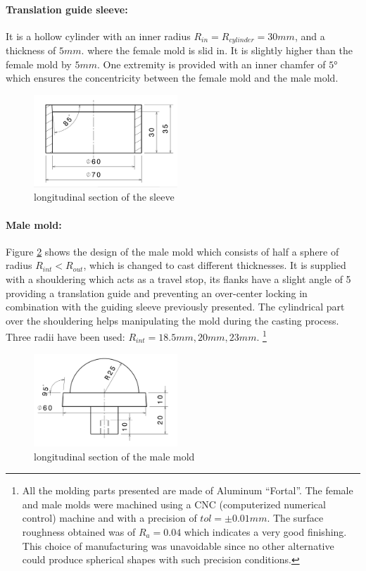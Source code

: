 \paragraph{\textbf{Translation guide sleeve:}}
It is a hollow cylinder with an inner radius $R_{in} = R_{cylinder} = 30 mm$, and a thickness of $5 mm$. where the female mold is slid in. It is slightly higher than the female mold by $5 mm$. One extremity is provided with an inner chamfer of $5°$ which ensures the concentricity between the female mold and the male mold.
\begin{figure}[h] %
	\centering%
  \includegraphics[width=0.48\textwidth]{figures/Chapter_1/sleeve_translation.jpg}
  \caption{longitudinal section of the sleeve}%
		\label{fig:sleeve_1}%
\end{figure}

\paragraph{\textbf{Male mold:}}
Figure \ref{fig:male_mold} shows the design of the male mold which consists of half a sphere of radius $R_{int}<R_{out}$, which is changed to cast different thicknesses. It is supplied with a shouldering which acts as a travel stop, its flanks have a slight angle of 5 providing a translation guide and preventing an over-center locking in combination with the guiding sleeve previously presented. The cylindrical part over the shouldering helps manipulating the mold during the casting process. Three radii have been used: $R_{int} = 18.5 mm, 20 mm, 23 mm$. 
\footnote{All the molding parts presented are made of Aluminum "`Fortal"'. The female and male molds were machined using a CNC (computerized numerical control)  machine and with a precision of $tol =\pm 0.01 mm$. The surface roughness obtained was of $R_a = 0.04$ which indicates a very good finishing.
This choice of manufacturing was unavoidable since no other alternative could produce spherical shapes with such precision conditions.}
\begin{figure}[h] %
	\centering%
  \includegraphics[width=0.48\textwidth]{figures/Chapter_1/male_mold.jpg}
	\caption{longitudinal section of the male mold}
	\label{fig:male_mold}
\end{figure}


